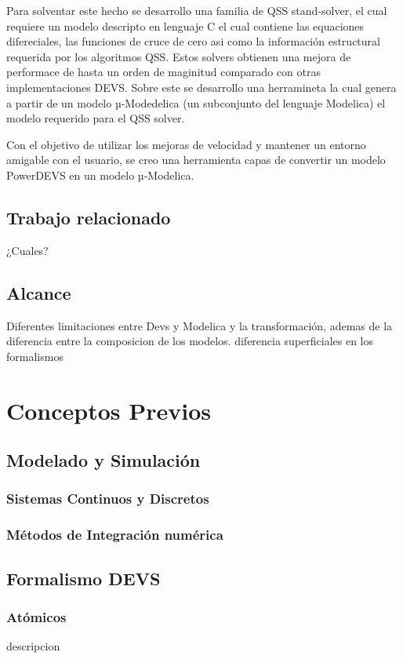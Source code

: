 \documentclass[a4paper,	11pt]{article}
\begin{document}
Para solventar este hecho se desarrollo una familia de QSS stand-solver, el cual requiere un modelo descripto en lenguaje C el cual contiene las equaciones difereciales, las funciones de cruce de cero asi como la información estructural requerida por los algoritmos QSS. Estos solvers obtienen una mejora de performace de hasta un orden de maginitud comparado con otras implementaciones DEVS.
Sobre este se desarrollo una herramineta la cual genera a partir de un modelo µ-Modedelica (un subconjunto del lenguaje Modelica) el modelo requerido para el QSS solver.

Con el objetivo de utilizar los mejoras de velocidad y mantener un entorno amigable con el usuario, se creo una herramienta capas de convertir un modelo PowerDEVS en un modelo µ-Modelica.


\subsection{Trabajo relacionado}
¿Cuales?
\subsection{Alcance}
 Diferentes limitaciones entre Devs y Modelica y la transformación, ademas de la diferencia entre la composicion de los modelos.
 diferencia superficiales en los formalismos

\section{Conceptos Previos}
\subsection{Modelado y Simulación}
\subsubsection{Sistemas Continuos y Discretos}
\subsubsection{Métodos de Integración numérica}
\subsection{Formalismo DEVS}
\subsubsection{Atómicos }
	descripcion
\end{document}

